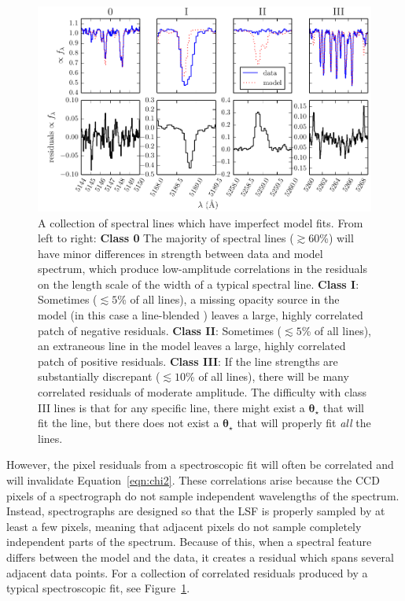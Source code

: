 \documentclass[preprint]{aastex} %
\newcommand{\vt}{ {\bm \theta}}
\newcommand{\vtstar}{\vt_{\star}}
\begin{document}
\begin{figure}[!htb]
\begin{center}
  \includegraphics{figs/badlines.pdf}
  \caption{A collection of spectral lines which have imperfect model fits.
    From left to right: \textbf{Class 0} The majority of spectral lines
    ($\gtrsim 60$\%) will have minor differences in strength between data and
    model spectrum, which produce low-amplitude correlations in the residuals
    on the length scale of the width of a typical spectral line.  \textbf{Class
    I}: Sometimes ($\lesssim 5$\% of all lines), a missing opacity source in
    the model (in this case a line-blended ) leaves a large, highly correlated
    patch of negative residuals.  \textbf{Class II}: Sometimes ($\lesssim 5$\%
    of all lines), an extraneous line in the model leaves a large, highly
    correlated patch of positive residuals.  \textbf{Class III}: If the line strengths are
    substantially discrepant ($\lesssim 10$\% of all lines), there will be many
    correlated residuals of moderate amplitude.  The difficulty
    with class III lines is that for any specific line, there might exist a
    $\vtstar$ that will fit the line, but there does not exist a $\vtstar$ that
    will properly fit \emph{all} the lines.}
\label{fig:badlines}
\end{center}
\end{figure}

However, the pixel residuals from a spectroscopic fit will often be correlated and will invalidate Equation~\ref{eqn:chi2}. These correlations arise because the CCD pixels of a spectrograph do not sample independent wavelengths of the spectrum. Instead, spectrographs are designed so that the LSF is properly sampled by at least a few pixels, meaning that adjacent pixels do not sample completely independent parts of the spectrum. Because of this, when a spectral feature differs between the model and the data, it creates a residual which spans several adjacent data points. For a collection of correlated residuals produced by a typical spectroscopic fit, see Figure~\ref{fig:badlines}. 
\end{document}
